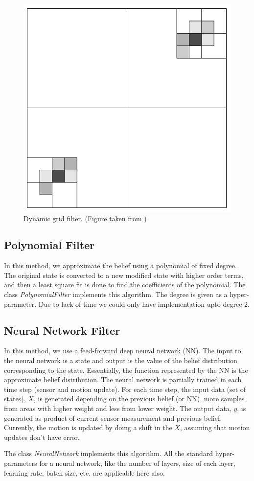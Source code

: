 \begin{figure}
\caption{Dynamic grid filter. (Figure taken from \cite{prob})}
\includegraphics[width=\linewidth]{dgrid}
\end{figure}

\subsection{Polynomial Filter}
In this method, we approximate the belief using a polynomial of fixed degree. The original state is converted to a new modified state with higher order terms, and then a least square fit is done to find the coefficients of the polynomial. The class \textit{PolynomialFilter} implements this algorithm. The degree is given as a hyper-parameter. Due to lack of time we could only have implementation upto degree $2$.

\subsection{Neural Network Filter}
In this method, we use a feed-forward deep neural network (NN). The input to the neural network is a state and output is the value of the belief distribution corresponding to the state. Essentially, the function represented by the NN is the approximate belief distribution. The neural network is partially trained in each time step (sensor and motion update). For each time step, the input data (set of states), $X$, is generated depending on the previous belief (or NN), more samples from areas with higher weight and less from lower weight. The output data, $y$, is generated as product of current sensor measurement and previous belief. Currently, the motion is updated by doing a shift in the $X$, assuming that motion updates don't have error.

The class \textit{NeuralNetwork} implements this algorithm. All the standard hyper-parameters for a neural network, like the number of layers, size of each layer, learning rate, batch size, etc. are applicable here also.